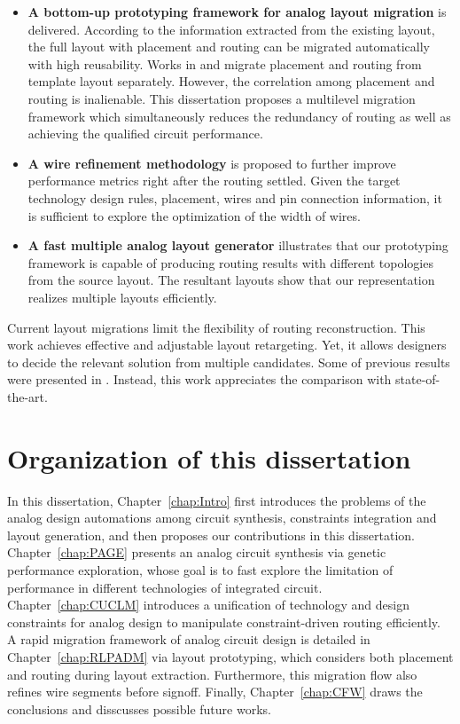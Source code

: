       \begin{itemize}
        \item {\bf A bottom-up prototyping framework for analog layout migration} is delivered. According to the information extracted from the existing layout, the full layout with placement and routing can be migrated automatically with high reusability. Works in \cite{ALP_YPWeng_iccad2011} and \cite{Chin_DMR_ICCAD2013} migrate placement and routing from template layout separately. However, the correlation among placement and routing is inalienable. This dissertation proposes a multilevel migration framework which simultaneously reduces the redundancy of routing as well as achieving the qualified circuit performance.
        \item {\bf A wire refinement methodology} is proposed to further improve performance metrics right after the routing settled. Given the target technology design rules, placement, wires and pin connection information, it is sufficient to explore the optimization of the width of wires.
        \item {\bf A fast multiple analog layout generator} illustrates that our prototyping framework is capable of producing routing results with different topologies from the source layout. The resultant layouts show that our representation realizes multiple layouts efficiently.
      \end{itemize}

      Current layout migrations limit the flexibility of routing reconstruction. This work achieves effective and adjustable layout retargeting. Yet, it allows designers to decide the relevant solution from multiple candidates. Some of previous results were presented in \cite{Chin_DMR_ICCAD2013}. Instead, this work appreciates the comparison with state-of-the-art.

  \section{Organization of this dissertation}\label{sec:organization}
    In this dissertation, Chapter~\ref{chap:Intro} first introduces the problems of the analog design automations among circuit synthesis, constraints integration and layout generation, and then proposes our contributions in this dissertation. Chapter~\ref{chap:PAGE} presents an analog circuit synthesis via genetic performance exploration, whose goal is to fast explore the limitation of performance in different technologies of integrated circuit. Chapter~\ref{chap:CUCLM} introduces a unification of technology and design constraints for analog design to manipulate constraint-driven routing efficiently. A rapid migration framework of analog circuit design is detailed in Chapter~\ref{chap:RLPADM} via layout prototyping, which considers both placement and routing during layout extraction. Furthermore, this migration flow also refines wire segments before signoff. Finally, Chapter~\ref{chap:CFW} draws the conclusions and disscusses possible future works.
